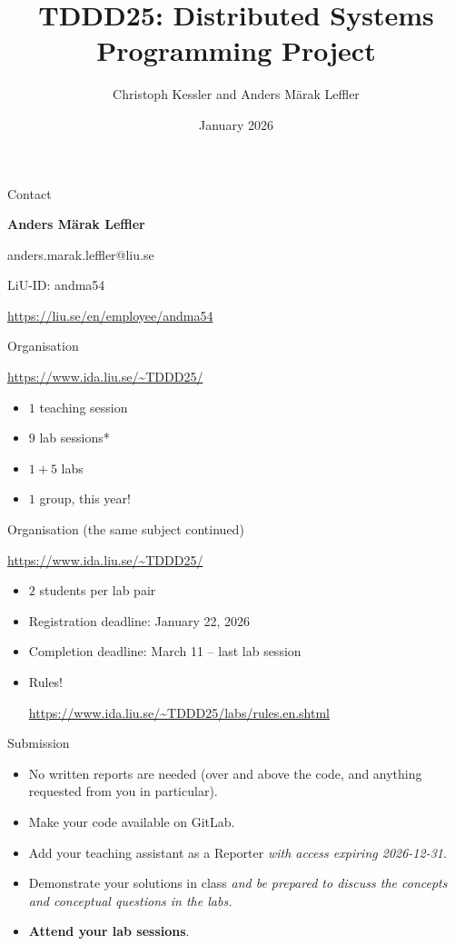 \documentclass[compress,xcolor=table]{beamer}
\title{%
  TDDD25: Distributed Systems\\%
  \vspace{0.1em}%
  Programming Project%
}
\author{Christoph Kessler and Anders Märak Leffler}
\date{January 2026}
\institute[Link\"oping University]{
  Department of Computer and Information Science\\
  Link\"oping University
}
\begin{document}
\frame[plain]{\titlepage}

\begin{frame}{Contact}
\begin{center}
  \textbf{Anders Märak Leffler}

  anders.marak.leffler@liu.se
  
  LiU-ID: andma54

  \scriptsize \url{https://liu.se/en/employee/andma54}

\end{center}
\end{frame}

\begin{frame}{Organisation}
  \begin{center}
    \url{https://www.ida.liu.se/~TDDD25/}
  \end{center}
  \begin{itemize}
    \item $1$ teaching session
    \item $9$ lab sessions*
    \item $1 + 5$ labs
    \item $1$ group, this year!
    \end{itemize}
\end{frame}

\begin{frame}{Organisation (the same subject continued)}
  \begin{center}
    \url{https://www.ida.liu.se/~TDDD25/}
  \end{center}
  \begin{itemize}
  \item $2$ students per lab pair
    \item Registration deadline: January 22, 2026
    \item Completion deadline: March 11 -- last lab session
    \item Rules!

      \scriptsize \url{https://www.ida.liu.se/~TDDD25/labs/rules.en.shtml}
  \end{itemize}
\end{frame}


\begin{frame}{Submission}
  \centering
  \begin{itemize}
    \item No written reports are needed (over and above the code, and anything requested from you in particular).
    \item Make your code available on GitLab.
    \item Add your teaching assistant as a Reporter \textit{with access expiring 2026-12-31}.
    \item Demonstrate your solutions in class \emph{and be prepared to discuss the concepts and conceptual questions in the labs.} 
    \item \textbf{Attend your lab sessions}.
  \end{itemize}
\end{frame}
\end{document}
